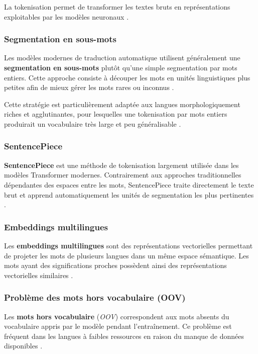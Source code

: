 La tokenisation permet de transformer les textes bruts en représentations exploitables par les modèles neuronaux \cite{Goodfellow-et-al-2016}.

\subsubsection{Segmentation en sous-mots}

Les modèles modernes de traduction automatique utilisent généralement une \textbf{segmentation en sous-mots} plutôt qu'une simple segmentation par mots entiers. Cette approche consiste à découper les mots en unités linguistiques plus petites afin de mieux gérer les mots rares ou inconnus \cite{toraman2022impact}.

Cette stratégie est particulièrement adaptée aux langues morphologiquement riches et agglutinantes, pour lesquelles une tokenisation par mots entiers produirait un vocabulaire très large et peu généralisable \cite{chen-fazio-2021-morphologically}.

\subsubsection{\ac{SentencePiece}}

\textbf{\ac{SentencePiece}} est une méthode de tokenisation largement utilisée dans les modèles Transformer modernes. Contrairement aux approches traditionnelles dépendantes des espaces entre les mots, SentencePiece traite directement le texte brut et apprend automatiquement les unités de segmentation les plus pertinentes \cite{meyer2024systematic}.

\subsubsection{Embeddings multilingues}

Les \textbf{embeddings multilingues} sont des représentations vectorielles permettant de projeter les mots de plusieurs langues dans un même espace sémantique. Les mots ayant des significations proches possèdent ainsi des représentations vectorielles similaires \cite{ali2026hybrid, meyer2024systematic}.

\subsubsection{Problème des mots hors vocabulaire (OOV)}

Les \textbf{mots hors vocabulaire} (\textit{\ac{OOV}}) correspondent aux mots absents du vocabulaire appris par le modèle pendant l'entraînement. Ce problème est fréquent dans les langues à faibles ressources en raison du manque de données disponibles \cite{ranathunga2023neural, toraman2022impact}.


